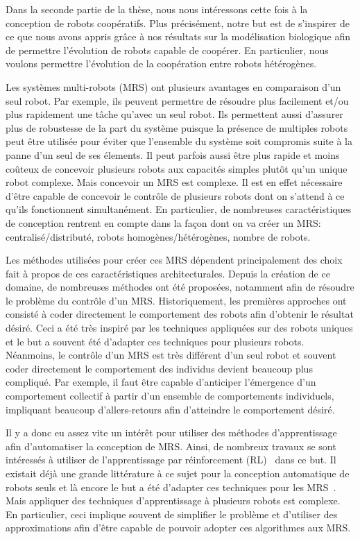 		Dans la seconde partie de la thèse, nous nous intéressons cette fois à la conception de robots coopératifs. Plus précisément, notre but est de s'inspirer de ce que nous avons appris grâce à nos résultats sur la modélisation biologique afin de permettre l'évolution de robots capable de coopérer. En particulier, nous voulons permettre l'évolution de la coopération entre robots hétérogènes.

		Les systèmes multi-robots (MRS) ont plusieurs avantages en comparaison d'un seul robot. Par exemple, ils peuvent permettre de résoudre plus facilement et/ou plus rapidement une tâche qu'avec un seul robot. Ils permettent aussi d'assurer plus de robustesse de la part du système puisque la présence de multiples robots peut être utilisée pour éviter que l'ensemble du système soit compromis suite à la panne d'un seul de ses élements. Il peut parfois aussi être plus rapide et moins coûteux de concevoir plusieurs robots aux capacités simples plutôt qu'un unique robot complexe. Mais concevoir un MRS est complexe. Il est en effet nécessaire d'être capable de concevoir le contrôle de plusieurs robots dont on s'attend à ce qu'ils fonctionnent simultanément. En particulier, de nombreuses caractéristiques de conception rentrent en compte dans la façon dont on va créer un MRS: centralisé/distributé, robots homogènes/hétérogènes, nombre de robots. 

		Les méthodes utilisées pour créer ces MRS dépendent principalement des choix fait à propos de ces caractéristiques architecturales. Depuis la création de ce domaine, de nombreuses méthodes ont été proposées, notamment afin de résoudre le problème du contrôle d'un MRS. Historiquement, les premières approches ont consisté à coder directement le comportement des robots afin d'obtenir le résultat désiré. Ceci a été très inspiré par les techniques appliquées sur des robots uniques et le but a souvent été d'adapter ces techniques pour plusieurs robots. Néanmoins, le contrôle d'un MRS est très différent d'un seul robot et souvent coder directement le comportement des individus devient beaucoup plus compliqué. Par exemple, il faut être capable d'anticiper l'émergence d'un comportement collectif à partir d'un ensemble de comportements individuels, impliquant beaucoup d'allers-retours afin d'atteindre le comportement désiré.

		Il y a donc eu assez vite un intérêt pour utiliser des méthodes d'apprentissage afin d'automatiser la conception de MRS. Ainsi, de nombreux travaux se sont intéressés à utiliser de l'apprentissage par réinforcement (RL)~\parencite{Sutton1998}  dans ce but. Il existait déjà une grande littérature à ce sujet pour la conception automatique de robots seuls et là encore le but a été d'adapter ces techniques pour les MRS~\parencite{Gultekin2002, Bowling2003, Fernandez2005}. Mais appliquer des techniques d'apprentissage à plusieurs robots est complexe. En particulier, ceci implique souvent de simplifier le problème et d'utiliser des approximations afin d'être capable de pouvoir adopter ces algorithmes aux MRS.

